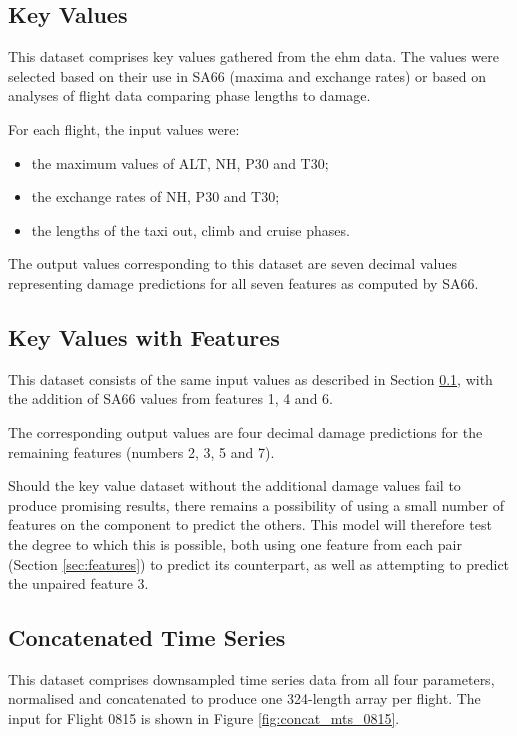 \subsection{Key Values} \label{sec:prac:dataset:kvs}
This dataset comprises key values gathered from the \ac{ehm} data. The values were selected based on their use in SA66 (maxima and exchange rates) or based on analyses of flight data comparing phase lengths to damage.

For each flight, the input values were:
\begin{itemize}
    \item the maximum values of ALT, NH, P30 and T30;
    \item the exchange rates of NH, P30 and T30;
    \item the lengths of the taxi out, climb and cruise phases.
\end{itemize}
The output values corresponding to this dataset are seven decimal values representing damage predictions for all seven features as computed by SA66.

\subsection{Key Values with Features} \label{sec:prac:dataset:kvfs}
This dataset consists of the same input values as described in Section \ref{sec:prac:dataset:kvs}, with the addition of SA66 values from features 1, 4 and 6.

The corresponding output values are four decimal damage predictions for the remaining features (numbers 2, 3, 5 and 7).

Should the key value dataset without the additional damage values fail to produce promising results, there remains a possibility of using a small number of features on the component to predict the others. This model will therefore test the degree to which this is possible, both using one feature from each pair (Section \ref{sec:features}) to predict its counterpart, as well as attempting to predict the unpaired feature 3.

\subsection{Concatenated Time Series} \label{sec:prac:dataset:catmts}
This dataset comprises downsampled time series data from all four parameters, normalised and concatenated to produce one 324-length array per flight. The input for Flight 0815 is shown in Figure \ref{fig:concat_mts_0815}.


